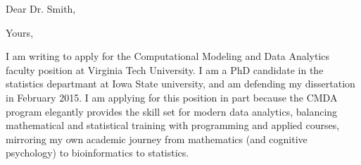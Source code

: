 \documentclass[11pt,letterpaper,sans,unicode]{moderncv}        %
\begin{document}
\date{November 5, 2014}
\opening{Dear Dr. Smith,}
\closing{Yours,}
\makelettertitle
% 

I am writing to apply for the Computational Modeling and Data Analytics faculty position at Virginia Tech University. I am a PhD candidate in the statistics departmant at Iowa State university, and am defending my dissertation in February 2015. I am applying for this position in part because the CMDA program elegantly provides the skill set for modern data analytics, balancing mathematical and statistical training with programming and applied courses, mirroring my own academic journey from mathematics (and cognitive psychology) to bioinformatics to statistics. 



\end{document}

